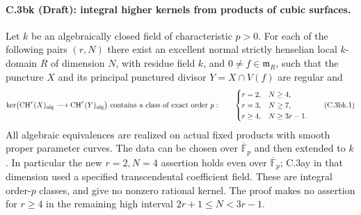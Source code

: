 \paragraph{C.3bk (Draft): integral higher kernels from products of cubic surfaces.}
Let $k$ be an algebraically closed field of characteristic $p>0$.
For each of the following pairs $(r,N)$ there exist an excellent normal
strictly henselian local $k$-domain $R$ of dimension $N$, with residue
field $k$, and $0\ne f\in\mathfrak m_R$, such that the puncture $X$
and its principal punctured divisor $Y=X\cap V(f)$ are regular and
\[
 \ker\bigl(\mathrm{CH}^r(X)_{\rm alg}
             \longrightarrow\mathrm{CH}^r(Y)_{\rm alg}\bigr)
 \text{ contains a class of exact order }p:
 \qquad
 \begin{cases}
 r=2,&N\ge4,\\
 r=3,&N\ge7,\\
 r\ge4,&N\ge3r-1.
 \end{cases}
 \tag{C.3bk.1}
\]
All algebraic equivalences are realized on actual fixed products with
smooth proper parameter curves. The data can be chosen over
$\overline{\mathbb F}_p$ and then extended to $k$. In particular the
new $r=2,N=4$ assertion holds even over $\overline{\mathbb F}_p$;
C.3ay in that dimension used a specified transcendental coefficient
field. These are integral order-$p$ classes, and give no nonzero
rational kernel. The proof makes no assertion for $r\ge4$ in the
remaining high interval $2r+1\le N<3r-1$.

